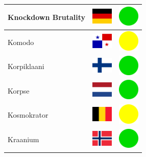 \documentclass[12pt, a4paper, twoside]{report}
\begin{document}
\begin{center}
\begin{longtable}{|p{5cm}|p{2cm}|p{2cm}|}
 Knockdown Brutality                                        & \includegraphics[width=1cm]{4x3/de} &   \includegraphics[width=1cm]{likes/y} \\ \hline
 Komodo                                                     & \includegraphics[width=1cm]{4x3/pa} &   \includegraphics[width=1cm]{likes/m} \\ \hline
 Korpiklaani                                                & \includegraphics[width=1cm]{4x3/fi} &   \includegraphics[width=1cm]{likes/y} \\ \hline
 Korpse                                                     & \includegraphics[width=1cm]{4x3/nl} &   \includegraphics[width=1cm]{likes/y} \\ \hline
 Kosmokrator                                                & \includegraphics[width=1cm]{4x3/be} &   \includegraphics[width=1cm]{likes/m} \\ \hline
 Kraanium                                                   & \includegraphics[width=1cm]{4x3/no} &   \includegraphics[width=1cm]{likes/y} \\ \hline

\end{longtable}
\end{center}
\end{document}
